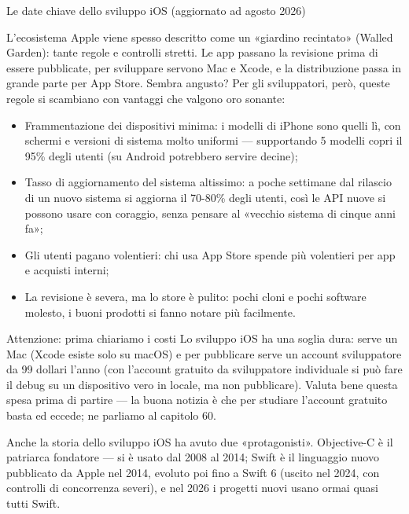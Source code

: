 \begin{center}\small\color{gray}Le date chiave dello sviluppo iOS (aggiornato ad agosto 2026)\end{center}


L'ecosistema Apple viene spesso descritto come un «giardino recintato» (Walled Garden): tante regole e controlli stretti. Le app passano la revisione prima di essere pubblicate, per sviluppare servono Mac e Xcode, e la distribuzione passa in grande parte per App Store. Sembra angusto? Per gli sviluppatori, però, queste regole si scambiano con vantaggi che valgono oro sonante:

\begin{itemize}
  \item Frammentazione dei dispositivi minima: i modelli di iPhone sono quelli lì, con schermi e versioni di sistema molto uniformi — supportando 5 modelli copri il 95\% degli utenti (su Android potrebbero servire decine);
  \item Tasso di aggiornamento del sistema altissimo: a poche settimane dal rilascio di un nuovo sistema si aggiorna il 70-80\% degli utenti, così le API nuove si possono usare con coraggio, senza pensare al «vecchio sistema di cinque anni fa»;
  \item Gli utenti pagano volentieri: chi usa App Store spende più volentieri per app e acquisti interni;
  \item La revisione è severa, ma lo store è pulito: pochi cloni e pochi software molesto, i buoni prodotti si fanno notare più facilmente.
\end{itemize}

\begin{tcbwarn}{Attenzione: prima chiariamo i costi}
Lo sviluppo iOS ha una soglia dura: serve un Mac (Xcode esiste solo su macOS) e per pubblicare serve un account sviluppatore da 99 dollari l'anno (con l'account gratuito da sviluppatore individuale si può fare il debug su un dispositivo vero in locale, ma non pubblicare). Valuta bene questa spesa prima di partire — la buona notizia è che per studiare l'account gratuito basta ed eccede; ne parliamo al capitolo 60.

\end{tcbwarn}


Anche la storia dello sviluppo iOS ha avuto due «protagonisti». Objective-C è il patriarca fondatore — si è usato dal 2008 al 2014; Swift è il linguaggio nuovo pubblicato da Apple nel 2014, evoluto poi fino a Swift 6 (uscito nel 2024, con controlli di concorrenza severi), e nel 2026 i progetti nuovi usano ormai quasi tutti Swift.

